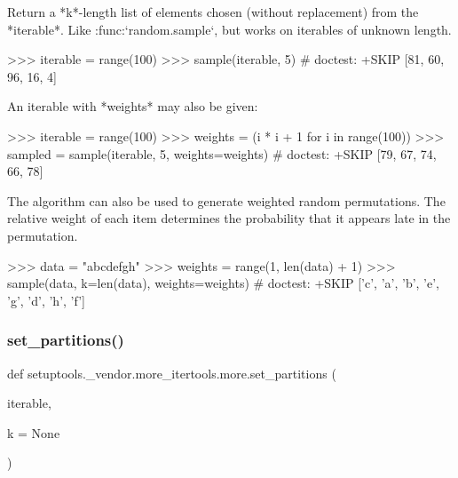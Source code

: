 \begin{DoxyVerb}Return a *k*-length list of elements chosen (without replacement)
from the *iterable*. Like :func:`random.sample`, but works on iterables
of unknown length.

>>> iterable = range(100)
>>> sample(iterable, 5)  # doctest: +SKIP
[81, 60, 96, 16, 4]

An iterable with *weights* may also be given:

>>> iterable = range(100)
>>> weights = (i * i + 1 for i in range(100))
>>> sampled = sample(iterable, 5, weights=weights)  # doctest: +SKIP
[79, 67, 74, 66, 78]

The algorithm can also be used to generate weighted random permutations.
The relative weight of each item determines the probability that it
appears late in the permutation.

>>> data = "abcdefgh"
>>> weights = range(1, len(data) + 1)
>>> sample(data, k=len(data), weights=weights)  # doctest: +SKIP
['c', 'a', 'b', 'e', 'g', 'd', 'h', 'f']
\end{DoxyVerb}
 \mbox{\label{namespacesetuptools_1_1__vendor_1_1more__itertools_1_1more_a3dfbf02981a97829237b11c914dad981}} 
\subsubsection{\texorpdfstring{set\+\_\+partitions()}{set\_partitions()}}
{\footnotesize\ttfamily def setuptools.\+\_\+vendor.\+more\+\_\+itertools.\+more.\+set\+\_\+partitions (\begin{DoxyParamCaption}\item[{}]{iterable,  }\item[{}]{k = {\ttfamily None} }\end{DoxyParamCaption})}

